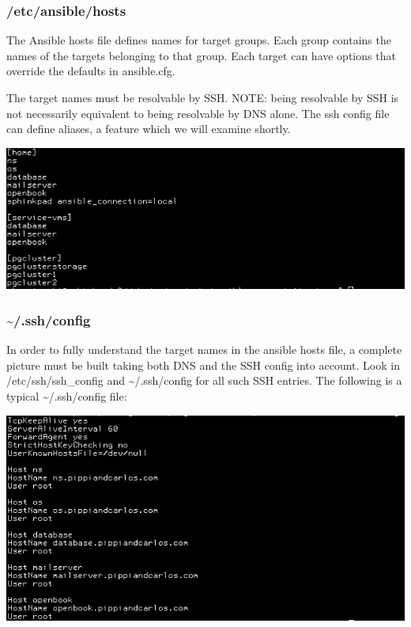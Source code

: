 \documentclass[helvetica,english,utf8,notitle,nologo]{beamer}
\begin{document}
\begin{frame}
  \frametitle{/etc/ansible/hosts}

  The Ansible hosts file defines names for target groups. Each group
  contains the names of the targets belonging to that group. Each
  target can have options that override the defaults in ansible.cfg.

  The target names must be resolvable by SSH. NOTE: being resolvable
  by SSH is not necessarily equivalent to being resolvable by DNS
  alone. The ssh config file can define aliases, a feature which we
  will examine shortly.

  \includegraphics[scale=0.44]{img_2}
\end{frame}

\begin{frame}
  \frametitle{\textasciitilde/.ssh/config}

  In order to fully understand the target names in the ansible hosts
  file, a complete picture must be built taking both DNS and the SSH
  config into account. Look in /etc/ssh/ssh\_config and
  \textasciitilde/.ssh/config for all such SSH entries. The following
  is a typical \textasciitilde/.ssh/config file:

  \includegraphics[scale=0.44]{img_3}
\end{frame}
\end{document}
